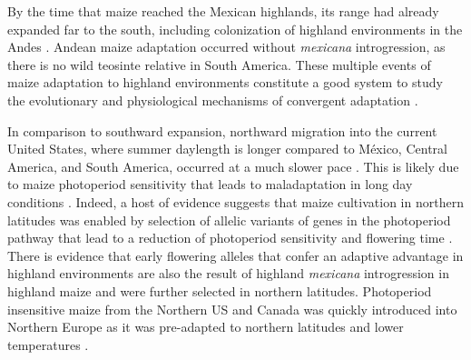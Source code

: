 \documentclass[9pt,twocolumn,twoside,lineno]{BioRxiv}
\begin{document}
By the time that maize reached the Mexican highlands, its range had already expanded far to the south, including colonization of highland environments in the  Andes \cite{Athens2016-ep, Grobman2012-pm}. 
Andean maize adaptation occurred without \textit{mexicana} introgression, as there is no wild teosinte relative in South America.
These multiple events of maize adaptation to highland environments constitute a good system to study the evolutionary and physiological mechanisms of convergent adaptation \cite{Takuno2015-uj, Wang2020-mp}.

In comparison to southward expansion, northward migration into the current United States, where summer daylength is longer compared to México, Central America, and South America, occurred at a much slower pace \cite{Da_Fonseca2015-zh, Swarts2017-ge}. 
This is likely due to maize photoperiod sensitivity that leads to maladaptation in long day conditions \cite{Hung2012-ms}. 
Indeed, a host of evidence suggests that maize cultivation in northern latitudes was enabled by selection of allelic variants of genes in the photoperiod pathway that lead to a reduction of photoperiod sensitivity and flowering time \cite{Liang2018-af, Guo2018-on, Coles2010-db, Huang2018-ga, Yang2013-lg, Salvi2007-ku, Wang2017-bc, Hung2012-ms}.
There is evidence that early flowering alleles that confer an adaptive advantage in highland environments are also the result of highland \textit{mexicana} introgression in highland maize \cite{Guo2018-on} and were further selected in northern latitudes.
Photoperiod insensitive maize from the Northern US and Canada was quickly introduced into Northern Europe as it was pre-adapted to northern latitudes and lower temperatures \cite{Brandenburg2017-ii}.
\end{document}
